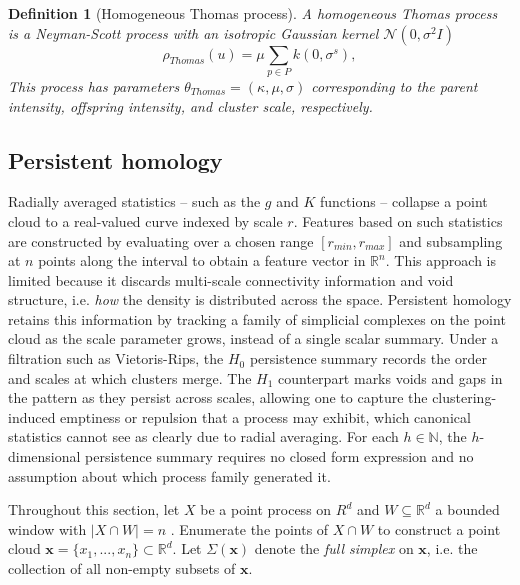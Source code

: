 \documentclass[11pt,letterpaper]{article}
\newcommand{\R}{\mathbb{R}}
\newcommand{\N}{\mathbb{N}}
\newcommand{\1}{\mathds{1}}
\newcommand{\pc}{\mathbf{x}}
\newcommand{\mo}{\mu}
\theoremstyle{plain}
\theoremstyle{definitioncolon}
\newtheorem{definition}[theorem]{Definition}
\begin{document}
    \begin{definition}[Homogeneous Thomas process]
    \label{def:thomas}
        A homogeneous Thomas process is a Neyman-Scott process with an isotropic
        Gaussian kernel $\mathcal{N}(0, \sigma^2I)$
            \[
            \rho_{Thomas}(u) = \mo \sum_{p \in P} k(0, \sigma^s),
            \]
        This process has parameters $\theta_{Thomas} = (\kappa, \mu, \sigma)$
        corresponding to the parent intensity, offspring intensity, and cluster
        scale, respectively.
    \end{definition}

\subsection{Persistent homology}
\label{ssec:persistence}

Radially averaged statistics -- such as the $g$ and $K$ functions -- collapse
a point cloud to a real-valued curve indexed by scale $r$. Features based on such
statistics are constructed by evaluating over a chosen range $[r_{min}, r_{max}]$
and subsampling at $n$ points along the interval to obtain a feature vector in $\R^n$.
This approach is limited because it discards multi-scale connectivity information and
void structure, i.e. \emph{how} the density is distributed across the space.
Persistent homology retains this information by tracking a family of simplicial
complexes on the point cloud as the scale parameter grows, instead of a single scalar
summary. Under a filtration such as Vietoris-Rips, the $H_0$ persistence summary records
the order and scales at which clusters merge. The $H_1$ counterpart marks voids and gaps
in the pattern as they persist across scales, allowing one to capture the clustering-induced
emptiness or repulsion that a process may exhibit, which canonical statistics cannot see as clearly
due to radial averaging.
For each $h \in \N$, the $h$-dimensional persistence summary requires no closed form expression
and no assumption about which process family generated it.

Throughout this section, let $X$ be a point process on $R^d$ and $W \subseteq \R^d$ a bounded window with
$|X \cap W| = n$ . Enumerate the points of $X \cap W$ to construct a point cloud
$\pc = \{x_1, ..., x_n\} \subset \R^d$. Let $\Sigma(\pc)$ denote the \emph{full
simplex} on $\pc$, i.e. the collection of all non-empty subsets of $\pc$.
\end{document}
